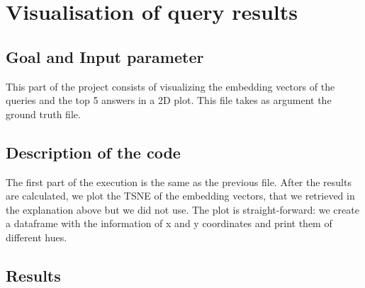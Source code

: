 \documentclass [14 pt]{article}
\begin{document}
\section{Visualisation of query results} %
\subsection{Goal and Input parameter} %
This part of the project consists of visualizing the embedding vectors of the queries and the top 5 answers in a 2D plot.
This file takes as argument the ground truth file.

\subsection{Description of the code} %
The first part of the execution is the same as the previous file. After the results are calculated, we plot the TSNE of the embedding vectors, that we retrieved in the explanation above but we did not use. The plot is straight-forward: we create a dataframe with the information of x and y coordinates and print them of different hues.
\subsection{Results} %
\end{document}
